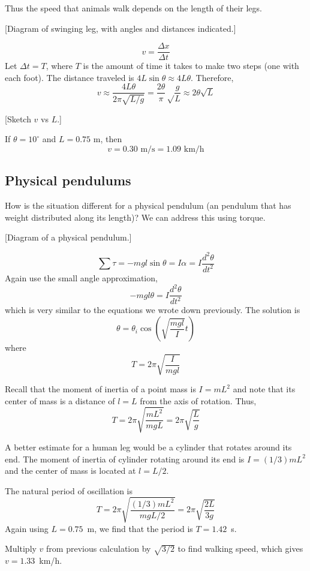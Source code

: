 Thus the speed that animals walk depends on the length of their legs. 

[Diagram of swinging leg, with angles and distances indicated.]\nopagebreak
\vspace{5cm}

$$v=\frac{\Delta{x}}{\Delta{t}}$$
Let $\Delta{t}=T$, where $T$ is the amount of time it takes to make two steps (one with each foot). The distance traveled is $4L\sin\theta\approx 4L\theta$. Therefore,
$$v\approx\frac{4L\theta}{2\pi\sqrt{L/g}}=\frac{2\theta}{\pi}\sqrt\frac{g}{L}\approx 2\theta\sqrt{L}$$

[Sketch $v$ vs $L$.]\nopagebreak
\vspace{5cm}

If $\theta=10^{\circ}$ and $L=0.75\mbox{ m}$, then 
$$\boxed{v=0.30\mbox{ m/s}=1.09\mbox{ km/h}}$$

\subsection{Physical pendulums}
How is the situation different for a physical pendulum (an pendulum that has weight distributed along its length)? We can address this using torque.

[Diagram of a physical pendulum.]\nopagebreak
\vspace{4cm}

$$\sum \tau = -mgl\sin\theta = I\alpha = I\frac{d^2\theta}{dt^2}$$
Again use the small angle approximation,
$$-mgl\theta = I\frac{d^2\theta}{dt^2}$$
which is very similar to the equations we wrote down previously. The solution is
$$\theta = \theta_i\cos\left(\sqrt{\frac{mgl}{I}}t\right)$$
where
$$\boxed{T=2\pi\sqrt{\frac{I}{mgl}}}$$

Recall that the moment of inertia of a point mass is $I=mL^2$ and note that its center of mass is a distance of $l=L$ from the axis of rotation. Thus,
$$T=2\pi\sqrt{\frac{mL^2}{mgL}}=2\pi\sqrt{\frac{L}{g}}$$

A better estimate for a human leg would be a cylinder that rotates around its end. The moment of inertia of cylinder rotating around its end is $I=(1/3)mL^2$ and the center of mass is located at $l=L/2$.

The natural period of oscillation is
$$T=2\pi\sqrt{\frac{(1/3)mL^2}{mgL/2}}=2\pi\sqrt{\frac{2L}{3g}}$$
Again using $L=0.75$~m, we find that the period is $T=1.42$~s.

Multiply $v$ from previous calculation by $\sqrt{3/2}$ to find walking speed, which gives $v=1.33$~km/h.

\clearpage
